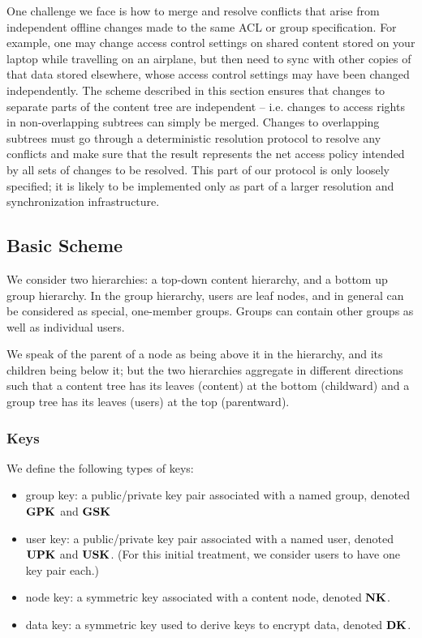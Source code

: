 One challenge we face is how to merge and resolve conflicts that arise
from independent offline changes made to the same ACL or group
specification. For example, one may change access control settings on
shared content stored on your laptop while travelling on an airplane,
but then need to sync with other copies of that data stored elsewhere,
whose access control settings may have been changed independently. The
scheme described in this section ensures that changes to separate
parts of the content tree are independent -- i.e. changes to access
rights in non-overlapping subtrees can simply be merged. Changes to
overlapping subtrees must go through a deterministic resolution
protocol to resolve any conflicts and make sure that the result
represents the net access policy intended by all sets of changes to be
resolved. This part of our protocol is only loosely specified; it is
likely to be implemented only as part of a larger resolution and
synchronization infrastructure.

\subsection{Basic Scheme}

We consider two hierarchies: a top-down content hierarchy, and a
bottom up group hierarchy. In the group hierarchy, users are leaf
nodes, and in general can be considered as special, one-member
groups. Groups can contain other groups as well as individual users.

We speak of the parent of a node as being above it in the hierarchy,
and its children being below it; but the two hierarchies aggregate in
different directions such that a content tree has its leaves (content)
at the bottom (childward) and a group tree has its leaves (users) at
the top (parentward).

\subsubsection{Keys}

We define the following types of keys:
\begin{itemize}
\item group key: a public/private key pair associated with a named group, denoted ${\textbf{GPK}}$ and ${\textbf{GSK}}$
\item user key: a public/private key pair associated with a named
  user, denoted ${\textbf{UPK}}$ and ${\textbf{USK}}$. (For this initial treatment, we
  consider users to have one key pair each.)
\item node key: a symmetric key associated with a content node, denoted ${\textbf{NK}}$.
\item data key: a symmetric key used to derive keys to encrypt data, denoted ${\textbf{DK}}$. 
\end{itemize}

